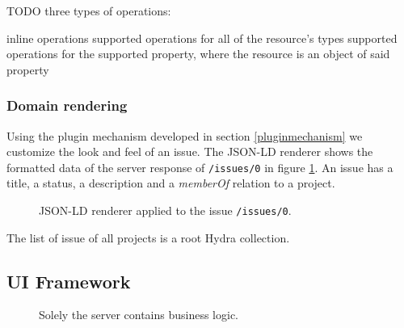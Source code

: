 TODO three types of operations:

inline operations
supported operations for all of the resource's types
supported operations for the supported property, where the resource is an object of said property

\subsubsection{Domain rendering}
Using the plugin mechanism developed in section \ref{pluginmechanism} we customize the look and feel of an issue. The JSON-LD renderer shows the formatted data of the server response of \lstinline{/issues/0} in figure \ref{fig:issue}. An issue has a title, a status, a description and a \textit{memberOf} relation to a project.

\begin{figure}[!htb]
  \caption{JSON-LD renderer applied to the issue \lstinline{/issues/0}.}
  \label{fig:issue}
\end{figure}

The list of issue of all projects is a root Hydra collection.


\subsection{UI Framework}

\begin{figure}[!htb]
  \caption{Solely the server contains business logic.}
\end{figure}

